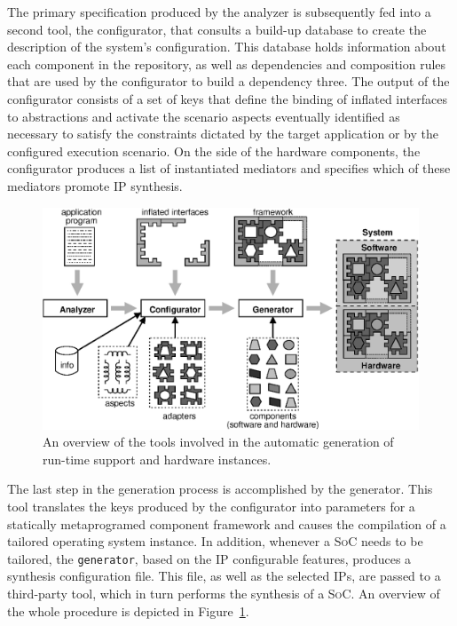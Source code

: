\documentclass{kapproc} %
\begin{document}
 The primary specification produced by the analyzer is subsequently
 fed into a second tool, the configurator, that consults a build-up
 database to create the description of the system's
 configuration. This database holds information about each component
 in the repository, as well as dependencies and composition rules that
 are used by the configurator to build a dependency three. The output
 of the configurator consists of a set of keys that define the binding
 of inflated interfaces to abstractions and activate the scenario
 aspects eventually identified as necessary to satisfy the constraints
 dictated by the target application or by the configured execution
 scenario. On the side of the hardware components, the configurator
 produces a list of instantiated mediators and specifies which of
 these mediators promote \textsc{IP} synthesis.

\begin{figure}{
\centering
\includegraphics[width=0.76\linewidth]{epos_overview.eps}\par}
\caption{An overview of the tools involved in the automatic generation of 
run-time support and hardware instances.}
\label{fig:epos_overview}
\end{figure}

 The last step in the generation process is accomplished by the
 generator. This tool translates the keys produced by the configurator
 into parameters for a statically metaprogramed component framework
 and causes the compilation of a tailored operating system
 instance. In addition, whenever a \textsc{SoC} needs to be tailored,
 the \texttt{generator}, based on the \textsc{IP} configurable
 features, produces a synthesis configuration file. This file, as well
 as the selected \textsc{IP}s, are passed to a third-party tool, which
 in turn performs the synthesis of a \textsc{SoC}. An overview of the
 whole procedure is depicted in Figure~\ref{fig:epos_overview}.
\end{document}
